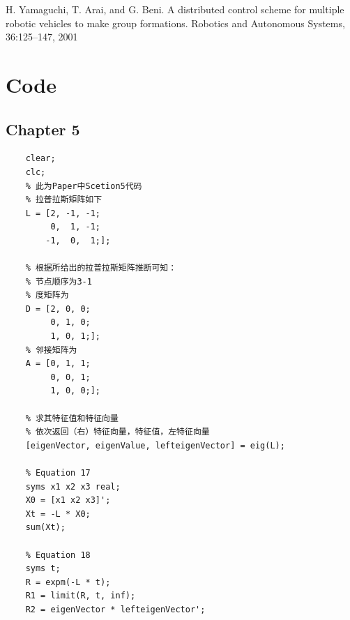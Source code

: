 \documentclass{article}
\begin{document}
\noindent [25] H. Yamaguchi, T. Arai, and G. Beni. A distributed control scheme for multiple robotic vehicles to make group formations. Robotics and Autonomous Systems, 36:125–147, 2001


\section*{Code}
\subsection*{Chapter 5}
\begin{lstlisting}
    clear;
    clc;
    % 此为Paper中Scetion5代码
    % 拉普拉斯矩阵如下
    L = [2, -1, -1;
         0,  1, -1;
        -1,  0,  1;];
    
    % 根据所给出的拉普拉斯矩阵推断可知：
    % 节点顺序为3-1
    % 度矩阵为
    D = [2, 0, 0;
         0, 1, 0;
         1, 0, 1;];
    % 邻接矩阵为
    A = [0, 1, 1;
         0, 0, 1;
         1, 0, 0;];
     
    % 求其特征值和特征向量
    % 依次返回（右）特征向量，特征值，左特征向量
    [eigenVector, eigenValue, lefteigenVector] = eig(L);
    
    % Equation 17
    syms x1 x2 x3 real;
    X0 = [x1 x2 x3]';
    Xt = -L * X0;
    sum(Xt);
    
    % Equation 18
    syms t;
    R = expm(-L * t);
    R1 = limit(R, t, inf);
    R2 = eigenVector * lefteigenVector'; 
\end{lstlisting}
\end{document}
